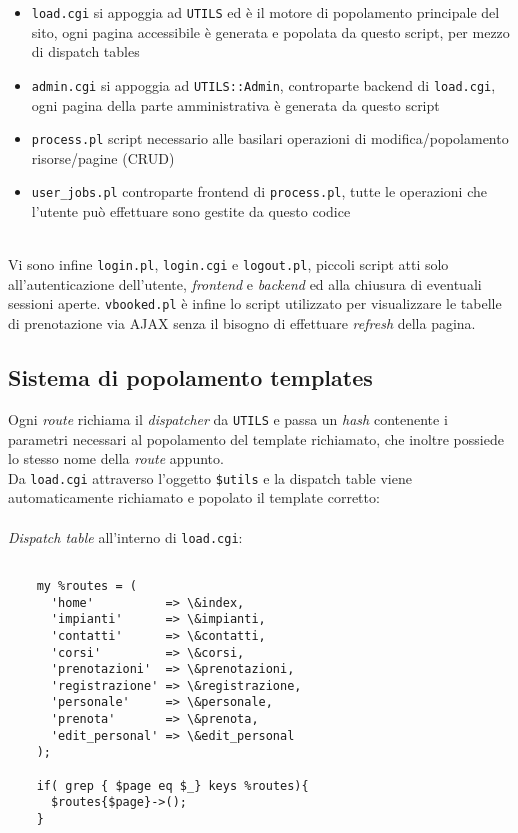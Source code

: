 \begin{itemize}

  \item \texttt{load.cgi} si appoggia ad \texttt{UTILS} ed è il motore di popolamento principale del sito, ogni pagina accessibile è generata e popolata da questo script, per mezzo di dispatch tables
  \item \texttt{admin.cgi} si appoggia ad \texttt{UTILS::Admin}, controparte backend di \texttt{load.cgi}, ogni pagina della parte amministrativa è generata da questo script
  \item \texttt{process.pl} script necessario alle basilari operazioni di modifica/popolamento risorse/pagine (CRUD)
  \item \texttt{user\_jobs.pl} controparte frontend di \texttt{process.pl}, tutte le operazioni che l'utente può effettuare sono gestite da questo codice

\end{itemize}
\leavevmode \\
Vi sono infine \texttt{login.pl}, \texttt{login.cgi} e \texttt{logout.pl}, piccoli script atti solo all'autenticazione dell'utente, \textit{frontend} e \textit{backend} ed alla chiusura di eventuali sessioni aperte.
\texttt{vbooked.pl} è infine lo script utilizzato per visualizzare le tabelle di prenotazione via AJAX senza il bisogno di effettuare \textit{refresh} della pagina.


\subsection{Sistema di popolamento templates}

Ogni \textit{route} richiama il \textit{dispatcher} da \texttt{UTILS} e passa un \textit{hash} contenente i parametri necessari al popolamento del template richiamato, che inoltre possiede lo stesso nome della \textit{route} appunto.
\leavevmode \\
Da \texttt{load.cgi} attraverso l'oggetto \texttt{\$utils} e la dispatch table viene automaticamente richiamato e popolato il template corretto:
\leavevmode \\
\leavevmode \\
\small{\textit{Dispatch table} all'interno di \texttt{load.cgi}:}


\scriptsize{
\begin{verbatim}

    my %routes = (
      'home'          => \&index,
      'impianti'      => \&impianti,
      'contatti'      => \&contatti,
      'corsi'         => \&corsi,
      'prenotazioni'  => \&prenotazioni,
      'registrazione' => \&registrazione,
      'personale'     => \&personale,
      'prenota'       => \&prenota,
      'edit_personal' => \&edit_personal
    );

    if( grep { $page eq $_} keys %routes){
      $routes{$page}->();
    }

\end{verbatim}
}

